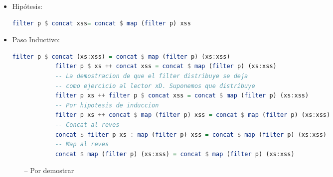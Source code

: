 \documentclass[spanish,12pt,letterpaper]{article}
\begin{document}
\begin{itemize}
\begin{itemize}
      \item Hipótesis:
        \begin{lstlisting}[language=Haskell]
          filter p $ concat xss= concat $ map (filter p) xss\end{lstlisting}
        \item Paso Inductivo:
          \begin{lstlisting}[language=Haskell]
            filter p $ concat (xs:xss) = concat $ map (filter p) (xs:xss)
            filter p $ xs ++ concat xss = concat $ map (filter p) (xs:xss)
            -- La demostracion de que el filter distribuye se deja
            -- como ejercicio al lector xD. Suponemos que distribuye
            filter p xs ++ filter p $ concat xss = concat $ map (filter p) (xs:xss)
            -- Por hipotesis de induccion
            filter p xs ++ concat $ map (filter p) xss = concat $ map (filter p) (xs:xss)
            -- Concat al reves
            concat $ filter p xs : map (filter p) xss = concat $ map (filter p) (xs:xss)
            -- Map al reves
            concat $ map (filter p) (xs:xss) = concat $ map (filter p) (xs:xss)
          \end{lstlisting}
  	  \begin{itemize}
  	  \item[--] Por demostrar
  	  \end{itemize}
      \end{itemize}
  \end{itemize}
\end{document}
